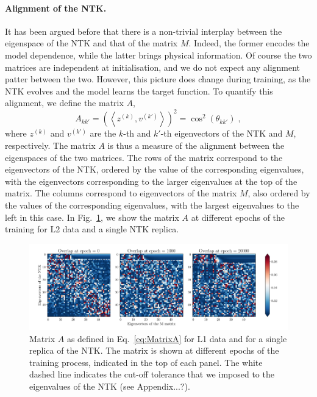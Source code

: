 \FloatBarrier

\paragraph{Alignment of the NTK.}
It has been argued before that there is a non-trivial interplay between the
eigenspace of the NTK and that of the matrix $M$. Indeed, the former encodes the
model dependence, while the latter brings physical information. Of course the
two matrices are independent at initialisation, and we do not expect any
alignment patter between the two. However, this picture does change during
training, as the NTK evolves and the model learns the target function. To
quantify this alignment, we define the matrix $A$, 
\begin{equation}
  \label{eq:MatrixA}
  A_{kk'} = \left( \left< z^{(k)}, v^{(k')}\right> \right)^2 = \cos^2(\theta_{kk'}) \;,
\end{equation}
where $z^{(k)}$ and $v^{(k')}$ are the $k$-th and $k'$-th eigenvectors of the
NTK and $M$, respectively. The matrix $A$ is thus a measure of the alignment
between the eigenspaces of the two matrices. The rows of the matrix correspond to 
the eigenvectors of the NTK, ordered by the value of the corresponding eigenvalues, 
with the eigenvectors corresponding to the larger 
eigenvalues at the top of the matrix. The columns correspond to eigenvectors 
of the matrix $M$, also ordered by the values of the corresponding eigenvalues, 
with the largest eigenvalues to the left in this case. In Fig.~\ref{fig:NtkMAlign}, we
show the matrix $A$ at different epochs of the training for L2 data and a
single NTK replica. 
\begin{figure}[ht!]
  \centering
  \includegraphics[width=1\textwidth]{plots/ntk_pheno/ntk_alignment.pdf}
  \caption{Matrix $A$ as defined in Eq.~\eqref{eq:MatrixA} for L1 data and for a
  single replica of the NTK. The matrix is shown at different epochs of the
  training process, indicated in the top of each panel. The white dashed line
  indicates the cut-off tolerance that we imposed to the eigenvalues of the NTK
  (see Appendix...?).}
  \label{fig:NtkMAlign}
\end{figure}
